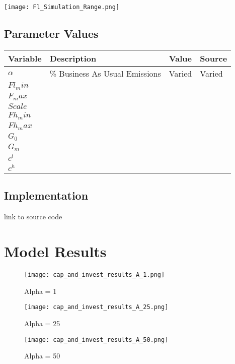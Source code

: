\documentclass[singlespace]{easychithesis}
\begin{document}
\texttt{[image: Fl\_Simulation\_Range.png]}


\subsection{Parameter Values}

\begin{tabulary}{1.0\textwidth}{LLLL}
Variable & Description & Value & Source\\
\hline
$\alpha$ &  \% Business As Usual Emissions  &  Varied  &  Varied \\
$Fl_min$ & & & \\
$F_max$ & & & \\
$Scale$ & & & \\
$Fh_min$ & & & \\
$Fh_max$ & & & \\
$G_0$ & & & \\
$G_m$ & & & \\
$c^l$ & & & \\
$c^h$ & & & \\
\hline
\end{tabulary}


\subsection{Implementation}
link to source code



\section{Model Results}
\FloatBarrier




\begin{figure}[h]\label{fig:SimpleResultsA=1}
\texttt{[image: cap\_and\_invest\_results\_A\_1.png]}
\caption{Alpha = 1}
\end{figure}

\begin{figure}[h]\label{fig:SimpleResultsA=25}
\texttt{[image: cap\_and\_invest\_results\_A\_25.png]}
\caption{Alpha = 25}
\end{figure}

\begin{figure}[h]\label{fig:SimpleResultsA=50}
\texttt{[image: cap\_and\_invest\_results\_A\_50.png]}
\caption{Alpha = 50}
\end{figure}
\end{document}
